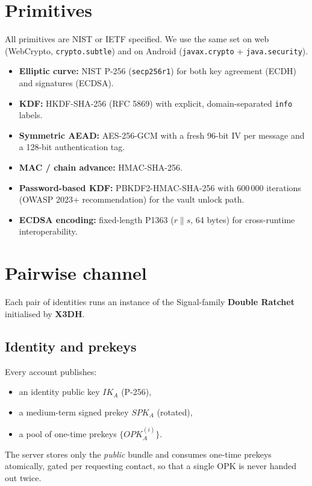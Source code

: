 \documentclass[11pt,a4paper]{article}
\newcommand{\code}[1]{\texttt{\small #1}}
\begin{document}
\section{Primitives}

All primitives are NIST or IETF specified. We use the same set on web
(WebCrypto, \code{crypto.subtle}) and on Android (\code{javax.crypto} +
\code{java.security}).

\begin{itemize}
  \item \textbf{Elliptic curve:} NIST P-256 (\code{secp256r1}) for both
    key agreement (ECDH) and signatures (ECDSA).
  \item \textbf{KDF:} HKDF-SHA-256 (RFC 5869) with explicit, domain-separated
    \texttt{info} labels.
  \item \textbf{Symmetric AEAD:} AES-256-GCM with a fresh 96-bit IV per
    message and a 128-bit authentication tag.
  \item \textbf{MAC / chain advance:} HMAC-SHA-256.
  \item \textbf{Password-based KDF:} PBKDF2-HMAC-SHA-256 with $600\,000$
    iterations (OWASP 2023+ recommendation) for the vault unlock path.
  \item \textbf{ECDSA encoding:} fixed-length P1363 ($r \| s$, 64 bytes)
    for cross-runtime interoperability.
\end{itemize}

\section{Pairwise channel}

Each pair of identities runs an instance of the Signal-family
\textbf{Double Ratchet} initialised by \textbf{X3DH}.

\subsection{Identity and prekeys}

Every account publishes:
\begin{itemize}
  \item an identity public key $IK_A$ (P-256),
  \item a medium-term signed prekey $SPK_A$ (rotated),
  \item a pool of one-time prekeys $\{OPK_A^{(i)}\}$.
\end{itemize}
The server stores only the \emph{public} bundle and consumes one-time
prekeys atomically, gated per requesting contact, so that a single OPK is
never handed out twice.
\end{document}
